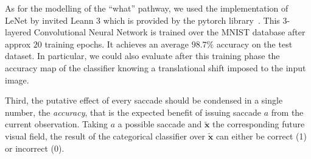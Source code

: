 As for the modelling of the ``what'' pathway, we used the implementation of LeNet by invited Leann 3 which is provided by the pytorch library~\citep{Paszke17}. This 3-layered Convolutional Neural Network is trained over the MNIST database after approx $20$ training epochs. It achieves an average $98.7\%$ accuracy on the test dataset. In particular, we could also evaluate after this  training phase the accuracy map of the classifier knowing a translational shift imposed to the input image. 





Third, the putative effect of every saccade should be condensed in a single number, the \emph{accuracy}, that is the expected benefit of issuing saccade $a$ %
from the current observation. Taking $a$ a possible saccade and $\tilde{\boldsymbol{x}}$ the corresponding future visual field, the result of the categorical classifier over $\tilde{\boldsymbol{x}}$ can either be correct (1) or incorrect (0). 
